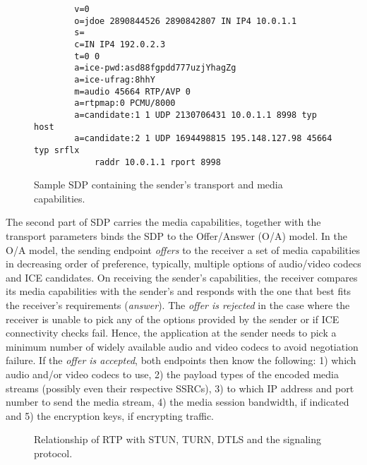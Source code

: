 
\begin{figure}[!h]
{\small
\begin{verbatim}
        v=0
        o=jdoe 2890844526 2890842807 IN IP4 10.0.1.1
        s=
        c=IN IP4 192.0.2.3
        t=0 0
        a=ice-pwd:asd88fgpdd777uzjYhagZg
        a=ice-ufrag:8hhY
        m=audio 45664 RTP/AVP 0
        a=rtpmap:0 PCMU/8000
        a=candidate:1 1 UDP 2130706431 10.0.1.1 8998 typ host
        a=candidate:2 1 UDP 1694498815 195.148.127.98 45664 typ srflx 
            raddr 10.0.1.1 rport 8998
\end{verbatim}
}
\caption{Sample SDP containing the sender's transport and media capabilities.}
\label{fig:3:sdp}
\end{figure}

The second part of SDP carries the media capabilities, together with the
transport parameters binds the SDP to the Offer/Answer (O/A) model. In the O/A
model, the sending endpoint \emph{offers} to the receiver a set of media
capabilities in decreasing order of preference, typically, multiple options of
audio/video codecs and ICE candidates. On receiving the sender's capabilities,
the receiver compares its media capabilities with the sender's and responds
with the one that best fits the receiver's requirements (\emph{answer}). The
\emph{offer is rejected} in the case where the receiver is unable to pick any
of the options provided by the sender or if ICE connectivity checks fail.
Hence, the application at the sender needs to pick a minimum number of widely
available audio and video codecs to avoid negotiation failure. If the
\emph{offer is accepted}, both endpoints then know the following: 1) which
audio and/or video codecs to use, 2) the payload types of the encoded media
streams (possibly even their respective SSRCs), 3) to which IP address and
port number to send the media stream, 4) the media session bandwidth, if
indicated and 5) the encryption keys, if encrypting traffic.

\begin{figure}
\caption{Relationship of RTP with STUN, TURN, DTLS and the signaling protocol.}
\label{fig:3:rtp-stack}
\end{figure}

